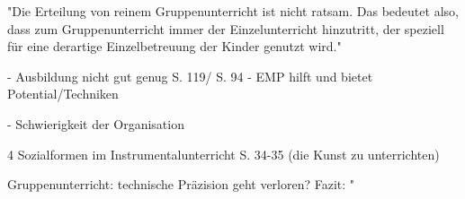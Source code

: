 "Die  Erteilung von reinem Gruppenunterricht ist nicht ratsam. Das
bedeutet also, dass zum Gruppenunterricht immer der Einzelunterricht hinzutritt,
der speziell für eine derartige Einzelbetreuung der Kinder genutzt wird."
\autocite[57]{ernst:die_zukunftsfaehige_musikschule}






- Ausbildung nicht gut genug S. 119/ S. 94
- EMP hilft und bietet Potential/Techniken

- Schwierigkeit der Organisation


4 Sozialformen im Instrumentalunterricht S. 34-35    (die Kunst zu unterrichten)



Gruppenunterricht: technische Präzision geht verloren? 
Fazit: "
